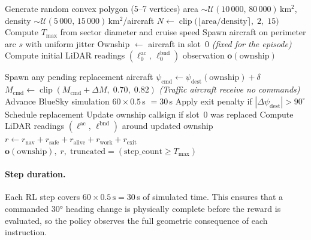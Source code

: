 \documentclass[11pt, a4paper]{article}
\begin{document}
\begin{algorithm}[h]
\caption{\textsc{Reset} — initialise a new episode}
\begin{algorithmic}[1]
\State Generate random convex polygon (5--7 vertices)
\State area $\sim\mathcal{U}(10\,000,\,80\,000)$\,km$^2$,\quad
       density $\sim\mathcal{U}(5\,000,\,15\,000)$\,km$^2$/aircraft
\State $N \leftarrow \operatorname{clip}\!\bigl(\lfloor\text{area}/\text{density}\rceil,\;2,\;15\bigr)$
\State Compute $T_\text{max}$ from sector diameter and cruise speed
    \State Spawn aircraft on perimeter arc $s$ with uniform jitter
\EndFor
\State Ownship $\leftarrow$ aircraft in slot~0 \quad\textit{(fixed for the episode)}
\State Compute initial LiDAR readings $(\boldsymbol{\ell}^\text{ac}_0,\,\boldsymbol{\ell}^\text{bnd}_0)$
\State \Return observation $\mathbf{o}(\text{ownship})$
\end{algorithmic}
\end{algorithm}

\begin{algorithm}[h]
\caption{\textsc{Step}(action) — advance one RL step (30\,s simulated)}
\begin{algorithmic}[1]
\State Spawn any pending replacement aircraft
    \State $\psi_\text{cmd} \leftarrow \psi_\text{dest}(\text{ownship}) + \delta$
    \State $M_\text{cmd} \leftarrow \operatorname{clip}(M_\text{cmd} + \Delta M,\;0.70,\;0.82)$
\EndIf
\State \textit{(Traffic aircraft receive no commands)}
\State Advance BlueSky simulation $60\times0.5$\,s $= 30$\,s
        \State Apply exit penalty if $|\Delta\psi_\text{dest}| > 90^\circ$
    \EndIf
    \State Schedule replacement
\EndFor
\State Update ownship callsign if slot~0 was replaced
\State Compute LiDAR readings $(\boldsymbol{\ell}^\text{ac},\,\boldsymbol{\ell}^\text{bnd})$ around updated ownship
\State $r \leftarrow r_\text{nav} + r_\text{safe} + r_\text{alive} + r_\text{work} + r_\text{exit}$
\State \Return $\mathbf{o}(\text{ownship}),\; r,\;
               \text{truncated}=(\text{step\_count} \geq T_\text{max})$
\end{algorithmic}
\end{algorithm}

\paragraph{Step duration.}
Each RL step covers $60 \times 0.5\,\text{s} = 30$\,s of simulated time.
This ensures that a commanded 30° heading change is physically complete before
the reward is evaluated, so the policy observes the full geometric consequence
of each instruction.
\end{document}
